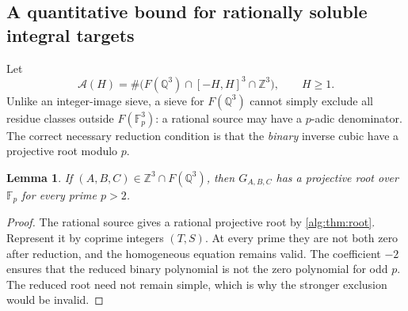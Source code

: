 \documentclass[11pt]{article}
\numberwithin{equation}{section}
\theoremstyle{plain}
\theoremstyle{plain}
\newtheorem{lemma}[lemma]{Lemma}
\theoremstyle{plain}
\theoremstyle{definition}
\theoremstyle{definition}
\theoremstyle{definition}
\theoremstyle{remark}
\newcommand{\Z}{\mathbb Z}\newcommand{\Q}{\mathbb Q}
\newcommand{\F}{\mathbb F}\newcommand{\A}{\mathbb A}\newcommand{\PP}{\mathbb P}
\begin{document}
\subsection{A quantitative bound for rationally soluble integral targets}
Let
\[
 \mathcal A(H)=\#\bigl(F(\Q^3)\cap[-H,H]^3\cap\Z^3\bigr),
 \qquad H\ge1.
\]
Unlike an integer-image sieve, a sieve for $F(\Q^3)$ cannot simply exclude
all residue classes outside $F(\F_p^3)$: a rational source may have a
$p$-adic denominator. The correct necessary reduction condition is that
the \emph{binary} inverse cubic have a projective root modulo $p$.

\begin{lemma}\label{alg:lem:reductionroot}
If $(A,B,C)\in\Z^3\cap F(\Q^3)$, then $G_{A,B,C}$ has a projective
root over $\F_p$ for every prime $p>2$.
\end{lemma}
\begin{proof}
The rational source gives a rational projective root by \cref{alg:thm:root}.
Represent it by coprime integers $(T,S)$. At every prime they are not
both zero after reduction, and the homogeneous equation remains valid.
The coefficient $-2$ ensures that the reduced binary polynomial is not
the zero polynomial for odd $p$. The reduced root need not remain simple,
which is why the stronger exclusion would be invalid.
\end{proof}
\end{document}
